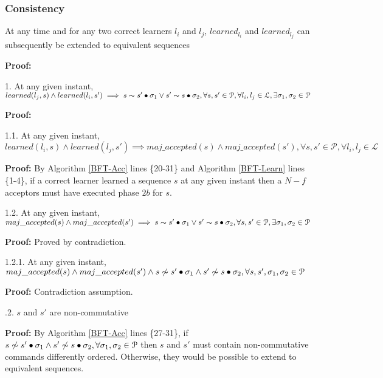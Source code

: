 \subsubsection{Consistency}
\begin{theorem}At any time and for any two correct learners $l_i$ and $l_j$, $learned_{l_i}$ and $learned_{l_j}$ can subsequently be extended to equivalent sequences \par
\end{theorem} 
\textbf{Proof:} \par
\parbox{\linewidth}{1. At any given instant, $learned(l_j,s) \land learned(l_i,s') \implies s \thicksim s' \bullet \sigma_1 \lor s' \thicksim s \bullet \sigma_2, \forall s,s' \in \mathcal{P}, \forall l_i,l_j \in \mathcal{L}, \exists \sigma_1,\sigma_2 \in \mathcal{P}$}  \par
\indent\indent\textbf{Proof:} \par
\indent\indent\indent\parbox{\linewidth-\algorithmicindent*3}{1.1. At any given instant, $learned(l_i,s) \land learned(l_j,s') \implies maj\_accepted(s) \land maj\_accepted(s'), \forall s,s' \in \mathcal{P}, \forall l_i,l_j \in \mathcal{L}$ } \par
\indent\indent\indent\indent\parbox{\linewidth-\algorithmicindent*4}{\textbf{Proof:} By Algorithm \ref{BFT-Acc} lines \{20-31\} and Algorithm \ref{BFT-Learn} lines \{1-4\}, if a correct learner learned a sequence $s$ at any given instant then a $N-f$ acceptors must have executed phase $2b$ for $s$.}\par
\indent\indent\indent\parbox{\linewidth-\algorithmicindent*3}{1.2. At any given instant, $maj\_accepted(s) \land maj\_accepted(s') \implies s \thicksim s' \bullet \sigma_1 \lor s' \thicksim s \bullet \sigma_2, \forall s,s' \in \mathcal{P}, \exists \sigma_1,\sigma_2 \in \mathcal{P}$}\par
\indent\indent\indent\indent\textbf{Proof:} Proved by contradiction.\par
\indent\indent\indent\indent\indent\parbox{\linewidth-\algorithmicindent*5}{1.2.1. At any given instant, $maj\_accepted(s) \land maj\_accepted(s') \wedge s \not\thicksim s' \bullet \sigma_1 \land s' \not\thicksim s \bullet \sigma_2, \forall s,s',\sigma_1,\sigma_2 \in \mathcal{P}$} \par
\indent\indent\indent\indent\indent\indent\textbf{Proof:} Contradiction assumption.\par
\indent\indent\indent\indent{}.2. $s$ and $s'$ are non-commutative \par
\indent\indent\indent\indent\indent\indent\parbox{\linewidth-\algorithmicindent*6}{\textbf{Proof:} By Algorithm \ref{BFT-Acc} lines \{27-31\}, if $s \not\thicksim s' \bullet \sigma_1 \land s' \not\thicksim s \bullet \sigma_2, \forall \sigma_1,\sigma_2 \in \mathcal{P}$ then $s$ and $s'$ must contain non-commutative commands differently ordered. Otherwise, they would be possible to extend to equivalent sequences.}\par
